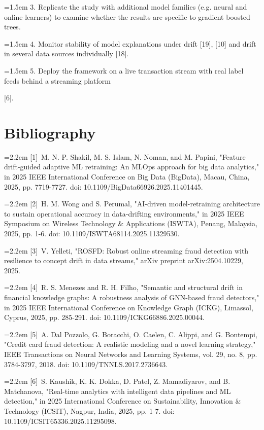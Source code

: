 \documentclass[11pt,letterpaper]{report}
\newcommand{\listitem}[1]{\par\hangindent=1.5em\hangafter=1 #1\par}
\newcommand{\bibentry}[2]{\par\hangindent=2.2em\hangafter=1 [#1]\ #2\par}
\begin{document}
\listitem{3. Replicate the study with additional model families (e.g. neural and online learners) to examine whether the results are specific to gradient boosted trees.}

\listitem{4. Monitor stability of model explanations under drift [19], [10] and drift in several data sources individually [18].}

\listitem{5. Deploy the framework on a live transaction stream with real label feeds behind a streaming platform}

[6].

\chapter*{Bibliography}

\bibentry{1}{M. N. P. Shakil, M. S. Islam, N. Noman, and M. Papini, "Feature drift-guided adaptive ML retraining: An MLOps approach for big data analytics," in 2025 IEEE International Conference on Big Data (BigData), Macau, China, 2025, pp. 7719-7727. doi: 10.1109/BigData66926.2025.11401445.}

\bibentry{2}{H. M. Wong and S. Perumal, "AI-driven model-retraining architecture to sustain operational accuracy in data-drifting environments," in 2025 IEEE Symposium on Wireless Technology \& Applications (ISWTA), Penang, Malaysia, 2025, pp. 1-6. doi: 10.1109/ISWTA68114.2025.11329530.}

\bibentry{3}{V. Yelleti, "ROSFD: Robust online streaming fraud detection with resilience to concept drift in data streams," arXiv preprint arXiv:2504.10229, 2025.}

\bibentry{4}{R. S. Menezes and R. H. Filho, "Semantic and structural drift in financial knowledge graphs: A robustness analysis of GNN-based fraud detectors," in 2025 IEEE International Conference on Knowledge Graph (ICKG), Limassol, Cyprus, 2025, pp. 285-291. doi: 10.1109/ICKG66886.2025.00044.}

\bibentry{5}{A. Dal Pozzolo, G. Boracchi, O. Caelen, C. Alippi, and G. Bontempi, "Credit card fraud detection: A realistic modeling and a novel learning strategy," IEEE Transactions on Neural Networks and Learning Systems, vol. 29, no. 8, pp. 3784-3797, 2018. doi: 10.1109/TNNLS.2017.2736643.}

\bibentry{6}{S. Kaushik, K. K. Dokka, D. Patel, Z. Mamadiyarov, and B. Matchanova, "Real-time analytics with intelligent data pipelines and ML detection," in 2025 International Conference on Sustainability, Innovation \& Technology (ICSIT), Nagpur, India, 2025, pp. 1-7. doi: 10.1109/ICSIT65336.2025.11295098.}
\end{document}
